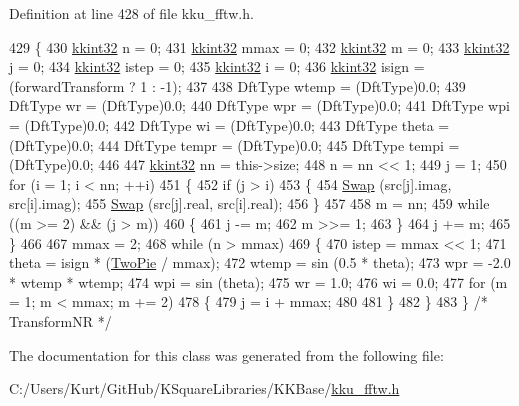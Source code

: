 Definition at line 428 of file kku\+\_\+fftw.\+h.


\begin{DoxyCode}
429   \{
430     \hyperlink{namespace_k_k_b_a8fa4952cc84fda1de4bec1fbdd8d5b1b}{kkint32}  n = 0;
431     \hyperlink{namespace_k_k_b_a8fa4952cc84fda1de4bec1fbdd8d5b1b}{kkint32}  mmax = 0;
432     \hyperlink{namespace_k_k_b_a8fa4952cc84fda1de4bec1fbdd8d5b1b}{kkint32}  m = 0;
433     \hyperlink{namespace_k_k_b_a8fa4952cc84fda1de4bec1fbdd8d5b1b}{kkint32}  j = 0;
434     \hyperlink{namespace_k_k_b_a8fa4952cc84fda1de4bec1fbdd8d5b1b}{kkint32}  istep = 0;
435     \hyperlink{namespace_k_k_b_a8fa4952cc84fda1de4bec1fbdd8d5b1b}{kkint32}  i = 0;
436     \hyperlink{namespace_k_k_b_a8fa4952cc84fda1de4bec1fbdd8d5b1b}{kkint32}  isign = (forwardTransform ? 1 : -1);
437 
438     DftType  wtemp = (DftType)0.0;
439     DftType  wr    = (DftType)0.0;
440     DftType  wpr   = (DftType)0.0;
441     DftType  wpi   = (DftType)0.0;
442     DftType  wi    = (DftType)0.0;
443     DftType  theta = (DftType)0.0;
444     DftType  tempr = (DftType)0.0;
445     DftType  tempi = (DftType)0.0;
446 
447     \hyperlink{namespace_k_k_b_a8fa4952cc84fda1de4bec1fbdd8d5b1b}{kkint32}  nn = this->size;
448     n = nn << 1;
449     j = 1;
450     \textcolor{keywordflow}{for}  (i = 1; i < nn;  ++i)
451     \{
452       \textcolor{keywordflow}{if}  (j > i)
453       \{
454         \hyperlink{namespace_k_k_b_aa407f810727f686de25d56fec45a9372}{Swap} (src[j].imag, src[i].imag);
455         \hyperlink{namespace_k_k_b_aa407f810727f686de25d56fec45a9372}{Swap} (src[j].real, src[i].real);
456       \}
457 
458       m = nn;
459       \textcolor{keywordflow}{while}  ((m >= 2)  &&  (j > m))
460       \{
461         j -= m;
462         m >>= 1;
463       \}
464       j += m;
465     \}
466 
467     mmax = 2;
468     \textcolor{keywordflow}{while}  (n > mmax)
469     \{
470       istep = mmax << 1;
471       theta = isign * (\hyperlink{_k_k_base_types_8h_a964d907aa0bbca73f950ed1659081d73}{TwoPie} / mmax);
472       wtemp = sin (0.5 * theta);
473       wpr = -2.0 * wtemp * wtemp;
474       wpi = sin (theta);
475       wr = 1.0;
476       wi = 0.0;
477       \textcolor{keywordflow}{for}  (m = 1;  m < mmax;  m += 2)
478       \{
479         j = i + mmax;
480 
481       \}
482     \}
483   \}  \textcolor{comment}{/* TransformNR */}
\end{DoxyCode}


The documentation for this class was generated from the following file\+:\begin{DoxyCompactItemize}
\item 
C\+:/\+Users/\+Kurt/\+Git\+Hub/\+K\+Square\+Libraries/\+K\+K\+Base/\hyperlink{kku__fftw_8h}{kku\+\_\+fftw.\+h}\end{DoxyCompactItemize}
